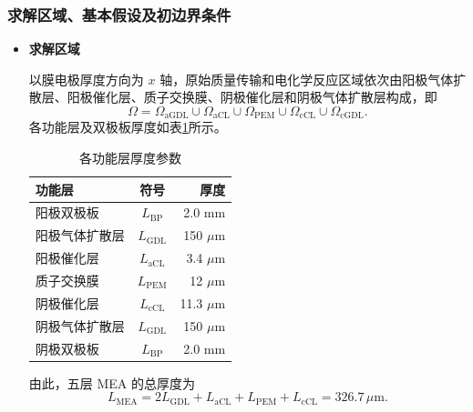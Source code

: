 \documentclass[bwprint]{gmcmthesis}
\numberwithin{equation}{section}
\numberwithin{figure}{section}
\begin{document}
\subsubsection{求解区域、基本假设及初边界条件}
\begin{itemize}
\renewcommand{\labelitemi}{$\blacktriangleright$}
\item \textbf {求解区域}

以膜电极厚度方向为 $x$ 轴，原始质量传输和电化学反应区域依次由阳极气体扩散层、阳极催化层、质子交换膜、阴极催化层和阴极气体扩散层构成，即
\begin{equation}
\Omega = \Omega_{\text{aGDL}} \cup \Omega_{\text{aCL}} \cup \Omega_{\text{PEM}} \cup \Omega_{\text{cCL}} \cup \Omega_{\text{cGDL}}.
\label{eq:src:4-1}
\end{equation}
各功能层及双极板厚度如表\ref{B4-1}所示。

\begin{table}[htbp]
    \centering
    \caption{各功能层厚度参数}
    \label{B4-1}
    \setlength{\tabcolsep}{24pt}  %
    \renewcommand{\arraystretch}{1.5} %
    
    \begin{tabular}{l c r} %
        \toprule
        \textbf{功能层} & \textbf{符号} & \textbf{厚度} \\
        \midrule
        阳极双极板       & \(L_{\text{BP}}\)  & 2.0 mm     \\
        阳极气体扩散层   & \(L_{\text{GDL}}\) & 150 \(\mu\)m \\
        阳极催化层       & \(L_{\text{aCL}}\) & 3.4 \(\mu\)m \\
        质子交换膜       & \(L_{\text{PEM}}\) & 12 \(\mu\)m  \\
        阴极催化层       & \(L_{\text{cCL}}\) & 11.3 \(\mu\)m \\
        阴极气体扩散层   & \(L_{\text{GDL}}\) & 150 \(\mu\)m \\
        阴极双极板       & \(L_{\text{BP}}\)  & 2.0 mm     \\
        \bottomrule
    \end{tabular}
\end{table}

 由此，五层 MEA 的总厚度为
\begin{equation}
L_{\text{MEA}} = 2L_{\text{GDL}} + L_{\text{aCL}} + L_{\text{PEM}} + L_{\text{cCL}} = 326.7 \, \mu\text{m}.
\label{eq:src:4-2}
\end{equation}


\end{itemize}
\end{document}
